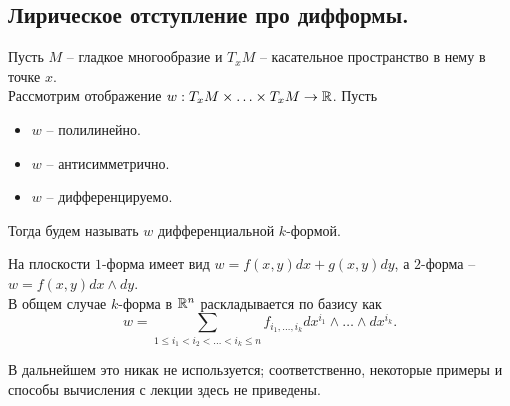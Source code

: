 \subsection{Лирическое отступление про дифформы.}
\begin{definition}
    Пусть $M$ -- гладкое многообразие и $T_{x}M$ -- касательное пространство в нему в точке $x$. \\
    Рассмотрим отображение $w: T_{x}M \times \ldots \times T_x M \to \mathbb{R}$. Пусть
    \begin{itemize}
        \item $w$ -- полилинейно.
        \item $w$ -- антисимметрично.
        \item $w$ -- дифференцируемо.
    \end{itemize}
    Тогда будем называть $w$ дифференциальной $k$-формой.
\end{definition}
\begin{example}
    На плоскости $1$-форма имеет вид $w = f(x, y)dx + g(x, y)dy$, а $2$-форма -- $w = f(x, y)dx\wedge dy$. \\
    В общем случае $k$-форма в $\mathbb{R}^n$ раскладывается по базису как
    \[
        w = \sum\limits_{1 \leq i_1 < i_2 < \ldots < i_k \leq n} f_{i_1, \ldots, i_k} dx^{i_1} \wedge \ldots \wedge dx^{i_k}.
    \]
\end{example}
\begin{note}
    В дальнейшем это никак не используется; соответственно, некоторые примеры и способы вычисления с лекции здесь не приведены.
\end{note}